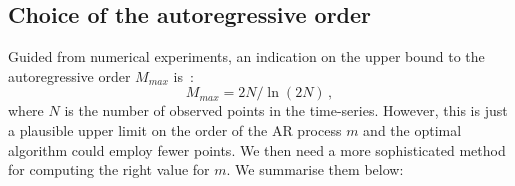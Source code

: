 \documentclass{aa}
\begin{document}
\subsection{Choice of the autoregressive order}\label{sec:optimizers} 

Guided from numerical experiments, an indication on the upper bound to the autoregressive order $M_{max}$ is~\citep{doi:10.1190/1.1440902}:
\begin{equation}\label{eq:MMAx}
M_{max} = 2N / \ln{(2N)}\,,
\end{equation}
where $N$ is the number of observed points in the time-series.
However, this is just a plausible upper limit on the order of the AR process $m$ and the optimal algorithm could employ fewer points.
We then need a more sophisticated method for computing the right value for $m$.
We summarise them below:
\end{document}
